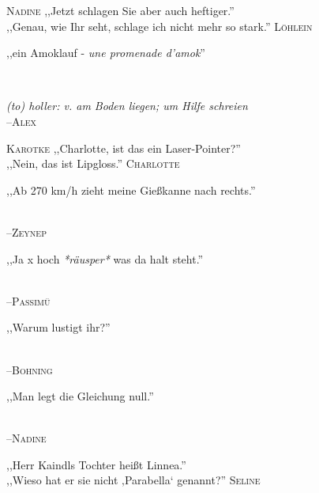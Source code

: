 \vspace{3mm}
\hangindent=0.7cm
\raggedright \textsc{\footnotesize Nadine} ,,Jetzt schlagen Sie aber auch heftiger.''\\
\raggedleft ,,Genau, wie Ihr seht, schlage ich nicht mehr so stark.'' \textsc{\footnotesize Löhlein}\\

\vspace{3mm}
{\raggedright ,,ein Amoklauf - \emph{une promenade d'amok}''}\\

\vspace{3mm}
\raggedright \emph{\footnotesize (to) holler: \emph{v.} am Boden liegen; um Hilfe schreien}\\
\raggedleft \textsc{\footnotesize --\/Alex}\\

\vspace{3mm}
\hangindent=0.7cm
\raggedright \textsc{\footnotesize Karotke} ,,Charlotte, ist das ein Laser-Pointer?''\\
\raggedleft ,,Nein, das ist Lipgloss.'' \textsc{\footnotesize Charlotte}\\

\vspace{3mm}
{\raggedright ,,Ab 270 km/h zieht meine Gießkanne nach rechts.''}\\
\raggedleft \textsc{\footnotesize --\/Zeynep}\\

\vspace{3mm}
{\raggedright ,,Ja x hoch \emph{*räusper*} was da halt steht.''}\\
\raggedleft \textsc{\footnotesize --\/Passimü}\\

\vspace{3mm}
{\raggedright ,,Warum lustigt ihr?''}\\
\raggedleft \textsc{\footnotesize --\/Bohning}\\

\vspace{3mm}
{\raggedright ,,Man legt die Gleichung null.''}\\
\raggedleft \textsc{\footnotesize --\/Nadine}\\

\vspace{3mm}
\hangindent=0.7cm
\raggedright \textsc{\footnotesize  } ,,Herr Kaindls Tochter heißt Linnea.''\\
\raggedleft ,,Wieso hat er sie nicht ‚Parabella‘ genannt?'' \textsc{\footnotesize Seline}\\

